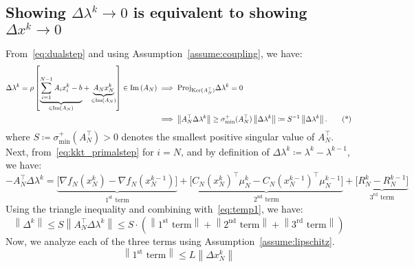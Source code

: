 \documentclass[11pt]{article}
\newcommand{\Image}[1]{\mathop{\text{Im}}\left(#1\right)}
\newcommand{\norm}[1]{\left\lVert #1 \right\rVert}
\begin{document}
\subsection{Showing $\Delta \lambda^k \to 0$ is equivalent to showing $\Delta x^k \to 0$}\label{sec:proof:lambda_to_x}
From~\eqref{eq:dualstep} and using Assumption~\ref{assume:coupling}, we have:
\begin{align}
\Delta \lambda^k = \rho\left[\underset{\in \Image{A_N}}{\underbrace{\sum_{i = 1}^{N-1} A_ix_i^k - b}} + \underset{\in \Image{A_N}}{\underbrace{A_N x_N^k}}\right] \in \Image{A_N}
&\implies \text{Proj}_{\text{Ker}(A_N^\top)} \Delta \lambda^k = 0 \notag \\
&\implies \norm{A_N^\top \Delta \lambda^k} \geq \sigma^{+}_{\text{min}}(A_N^\top) \norm{\Delta \lambda^k} \coloneqq S^{-1} \norm{\Delta \lambda^k}. \tag{*} \label{eq:temp1}
\end{align}
where $S \coloneqq \sigma^{+}_{\text{min}}(A_N^\top) > 0$ denotes the smallest positive singular value of $A_N^\top$.
Next, from~\eqref{eq:kkt_primalstep} for $i = N$, and by definition of $\Delta \lambda^k \coloneqq \lambda^k - \lambda^{k-1}$, we have:
\begin{equation*}
-A_N^\top \Delta \lambda^k =
\underset{1^\text{st} \text{ term}}{\underbrace{\big[\nabla f_N(x_N^k) - \nabla f_N(x_N^{k-1})\big]}}
+ \underset{2^\text{nd} \text{ term}}{\underbrace{\big[C_N(x_N^k)^\top \mu_N^k - C_N(x_N^{k-1})^\top \mu_N^{k-1}\big]}}
+ \underset{3^\text{rd} \text{ term}}{\underbrace{\big[R_N^k - R_N^{k-1}\big]}}
\end{equation*}
Using the triangle inequality and combining with~\eqref{eq:temp1}, we have:
\begin{equation*}
\norm{\Delta^k} \leq S\norm{A_N^\top \Delta \lambda^k} \leq S\cdot\left(\norm{1^\text{st} \text{ term}} + \norm{2^\text{nd} \text{ term}} + \norm{3^\text{rd} \text{ term}}\right)
\end{equation*}
Now, we analyze each of the three terms using Assumption~\eqref{assume:lipschitz}.
\begin{equation*}
\norm{1^\text{st} \text{ term}} \leq L \norm{\Delta x_N^k}
\end{equation*}
\end{document}
